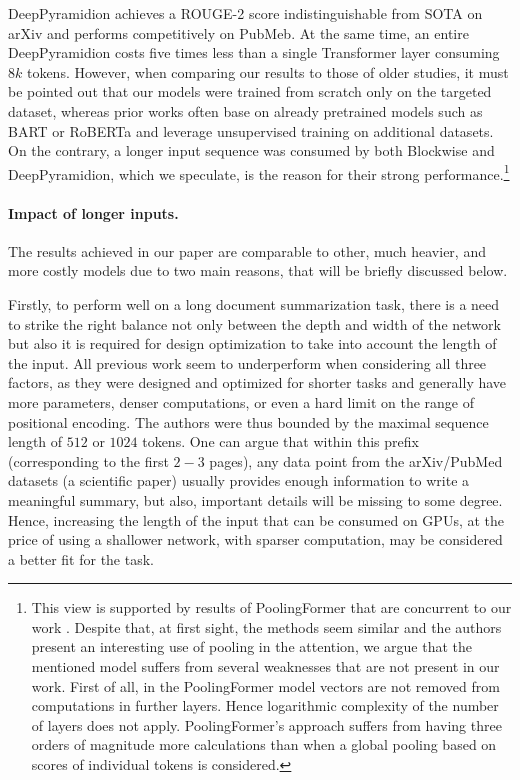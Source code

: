 \documentclass{article}
\begin{document}
 DeepPyramidion achieves a ROUGE-2 score indistinguishable from SOTA on arXiv and performs competitively on PubMeb. At the same time, an entire DeepPyramidion costs five times less than a single Transformer layer consuming $8k$ tokens. However, when comparing our results to those of older studies, it must be pointed out that our models were trained from scratch only on the targeted dataset, whereas prior works often base on already pretrained models such as BART or RoBERTa and leverage unsupervised training on additional datasets. On the contrary, a longer input sequence was consumed by both Blockwise and DeepPyramidion, which we speculate, is the reason for their strong performance.\footnote{ This view is supported by results of PoolingFormer that are concurrent to our work \citep{zhang2021poolingformer}. Despite that, at first sight, the methods seem similar and the authors present an interesting use of pooling in the attention, we argue that the mentioned model suffers from several weaknesses that are not present in our work. First of all, in the PoolingFormer model vectors are not removed from computations in further layers. Hence logarithmic complexity of the number of layers does not apply. PoolingFormer's approach suffers from having three orders of magnitude more calculations than when a global pooling based on scores of individual tokens is considered.}

\paragraph{Impact of longer inputs.}
The results achieved in our paper are comparable to other, much heavier, and more costly models due to two main reasons, that will be briefly discussed below.

Firstly, to perform well on a long document summarization task, there is a need to strike the right balance not only between the depth and width of the network but also it is required for design optimization to take into account the length of the input. All previous work seem to underperform when considering all three factors, as they were designed and optimized for shorter tasks and generally have more parameters, denser computations, or even a hard limit on the range of positional encoding. The authors were thus bounded by the maximal sequence length of $512$ or $1024$ tokens. One can argue that within this prefix (corresponding to the first $2-3$ pages), any data point from the arXiv/PubMed datasets (a scientific paper) usually provides enough information to write a meaningful summary, but also, important details will be missing to some degree. Hence, increasing the length of the input that can be consumed on GPUs, at the price of using a shallower network, with sparser computation, may be considered a better fit for the task.
\end{document}
